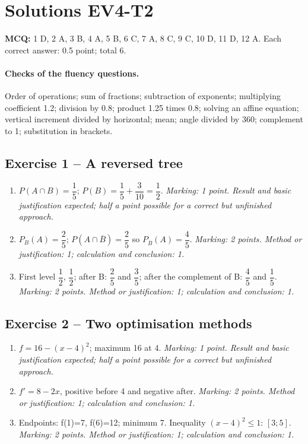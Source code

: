 \clearpage\section*{Solutions EV4-T2}\label{EV4-T2-CORR}
\textbf{MCQ:} 1 D, 2 A, 3 B, 4 A, 5 B, 6 C, 7 A, 8 C, 9 C, 10 D, 11 D, 12 A. Each correct answer: 0.5 point; total 6.
\paragraph{Checks of the fluency questions.} Order of operations; sum of fractions; subtraction of exponents; multiplying coefficient 1.2; division by 0.8; product 1.25 times 0.8; solving an affine equation; vertical increment divided by horizontal; mean; angle divided by 360; complement to 1; substitution in brackets.
\subsection*{Exercise 1 -- A reversed tree}
\begin{enumerate}
\item $P(A\cap B)=\dfrac{1}{5}$; $P(B)=\dfrac{1}{5}+\dfrac{3}{10}=\dfrac{1}{2}$. \textit{Marking: 1 point. Result and basic justification expected; half a point possible for a correct but unfinished approach.}
\item $P_B(A)=\dfrac{2}{5}$; $P(A\cap\overline B)=\dfrac{2}{5}$ so $P_{\overline B}(A)=\dfrac{4}{5}$. \textit{Marking: 2 points. Method or justification: 1; calculation and conclusion: 1.}
\item First level $\dfrac{1}{2}$, $\dfrac{1}{2}$; after B: $\dfrac{2}{5}$ and $\dfrac{3}{5}$; after the complement of B: $\dfrac{4}{5}$ and $\dfrac{1}{5}$. \textit{Marking: 2 points. Method or justification: 1; calculation and conclusion: 1.}
\end{enumerate}
\subsection*{Exercise 2 -- Two optimisation methods}
\begin{enumerate}
\item $f=16-(x-4)^2$; maximum 16 at 4. \textit{Marking: 1 point. Result and basic justification expected; half a point possible for a correct but unfinished approach.}
\item $f\prime=8-2x$, positive before 4 and negative after. \textit{Marking: 2 points. Method or justification: 1; calculation and conclusion: 1.}
\item Endpoints: f(1)=7, f(6)=12; minimum 7. Inequality $(x-4)^2\leq1$: $[3;5]$. \textit{Marking: 2 points. Method or justification: 1; calculation and conclusion: 1.}
\end{enumerate}

